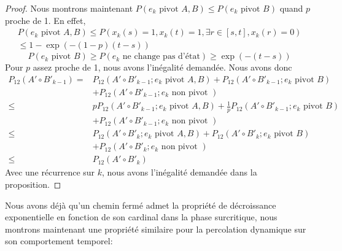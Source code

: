 \documentclass[titlepage,a4paper,12pt]{article}
\newcounter{prop}
\begin{document}
\begin{proof}
Nous montrons maintenant $P(e_k \text{ pivot } A,B) \leqslant P(e_k \text{ pivot } B)$ quand $p$ proche de 1. En effet, 
\begin{multline*}
P(e_k \text{ pivot } A,B)\leqslant P(x_k(s) = 1, x_k(t) =1, \exists r\in [s,t], x_k(r) = 0)\\
 \leqslant 1- \exp(-(1-p)(t-s))
\end{multline*}
$$P(e_k \text{ pivot }B) \geqslant P(e_k \text{ ne change pas d'état}) \geqslant \exp(-(t-s))
$$
Pour $p$ assez proche de 1, nous avons l'inégalité demandée. Nous avons donc
\begin{align*}
P_{12}(A'\circ B'_{k-1}) =& P_{12}(A'\circ B'_{k-1};e_k \text{ pivot } A,B) + P_{12}(A'\circ B'_{k-1};e_k \text{ pivot } B) \\
  &+ P_{12}(A'\circ B'_{k-1};e_k \text{ non pivot })\\
\leqslant &  p P_{12}(A'\circ B'_{k-1};e_k \text{ pivot } A,B) + \frac{1}{p}P_{12}(A'\circ B'_{k-1};e_k \text{ pivot } B) \\
  &+ P_{12}(A'\circ B'_{k-1};e_k \text{ non pivot })\\
\leqslant & P_{12}(A'\circ B'_{k};e_k \text{ pivot } A,B) + P_{12}(A'\circ B'_{k};e_k \text{ pivot } B) \\
  &+ P_{12}(A'\circ B'_{k};e_k \text{ non pivot })\\
  \leqslant & P_{12}(A'\circ B'_{k})
\end{align*}
Avec une récurrence sur $k$, nous avons l'inégalité demandée dans la proposition.
\end{proof}

Nous avons déjà qu'un chemin fermé admet la propriété de décroissance exponentielle en fonction de son cardinal dans la phase surcritique, nous montrons maintenant une propriété similaire pour la percolation dynamique sur son comportement temporel: 
\end{document}
